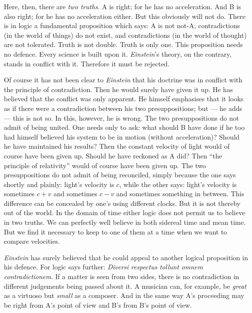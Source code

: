 \documentclass[12pt,a4paper]{article}
\begin{document}
Here, then, there are \emph{two truths}. A is right; for he has no
acceleration. And B is also right; for he has no acceleration either. But this
obviously will not do. There is in logic a fundamental proposition which says:
A is not not-A; contradictions (in the world of things) do not exist, and
contradictions (in the world of thought) are not tolerated. Truth is not
double. Truth is only one. This proposition needs no defence. Every science is
built upon it. \emph{Einstein}'s theory, on the contrary, stands in conflict
with it. Therefore it must be rejected.

Of course it has not been clear to \emph{Einstein} that his doctrine was in
conflict with the principle of contradiction. Then he would surely have given
it up. He has believed that the conflict was only apparent. He himself
emphasises that it looks as if there were a contradiction between his two
presuppositions; but --- he adds --- this is not so. In this, however, he is
wrong. The two presuppositions do not admit of being united. One needs only to
ask: what should B have done if he too had himself believed his system to be
in motion (without acceleration)? Should he have maintained his results? Then
the constant velocity of light would of course have been given up. Should he
have reckoned as A did? Then ``the principle of relativity'' would of course
have been given up. The two presuppositions do not admit of being reconciled,
simply because the one says shortly and plainly: light's velocity is $c$,
while the other says: light's velocity is sometimes $c + v$ and sometimes
$c - v$ and sometimes something in between. This difference can be concealed
by one's using different clocks. But it is not thereby out of the world. In
the domain of time either logic does not permit us to believe in two truths.
We can perfectly well believe in both sidereal time and mean time. But we find
it necessary to keep to one of them at a time when we want to compare
velocities.

\emph{Einstein} has surely believed that he could appeal to another logical
proposition in his defence. For logic says further:
\textit{Diversi respectus tollunt omnem contradictionem}. If a matter is seen
from two sides, there is no contradiction in different judgements being passed
about it. A musician can, for example, be \emph{great} as a virtuoso but
\emph{small} as a
composer. And in the same way A's proceeding may be right from A's point of
view and B's from B's point of view.
\end{document}
